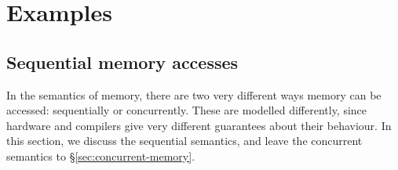 \section{Examples}

\subsection{Sequential memory accesses}
\label{sec:sequential-memory}

In the semantics of memory, there are two very different ways memory
can be accessed: sequentially or concurrently. These are modelled
differently, since hardware and compilers give very different
guarantees about their behaviour.
In this section, we discuss the sequential semantics, and leave
the concurrent semantics to \S\ref{sec:concurrent-memory}.

